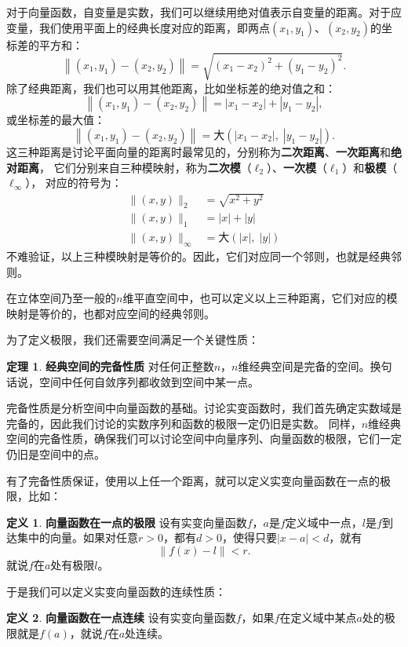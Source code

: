 \documentclass[12pt,UTF8]{ctexbook}
\theoremstyle{definition}
\newtheorem{df}{定义}[section]
\newtheorem{tm}{定理}[section]
\theoremstyle{plain}
\begin{document}
对于向量函数，自变量是实数，我们可以继续用绝对值表示自变量的距离。对于应变量，我们使用平面上的经典长度对应的距离，即两点$(x_1, y_1)$、$(x_2, y_2)$的坐标差的平方和：
$$ \left\| (x_1, y_1) - (x_2, y_2)\right\| = \sqrt{(x_1 - x_2)^2 + (y_1 - y_2)^2}. $$
除了经典距离，我们也可以用其他距离，比如坐标差的绝对值之和：
$$ \left\| (x_1, y_1) - (x_2, y_2)\right\| = |x_1 - x_2| + |y_1 - y_2|,$$
或坐标差的最大值：
$$ \left\| (x_1, y_1) - (x_2, y_2)\right\| = \text{大}(|x_1 - x_2|,\; |y_1 - y_2|). $$
这三种距离是讨论平面向量的距离时最常见的，分别称为\textbf{二次距离}、\textbf{一次距离}和\textbf{绝对距离}，
它们分别来自三种模映射，称为\textbf{二次模}（$\ell_2$）、\textbf{一次模}（$\ell_1$）和\textbf{极模}（$\ell_{\infty}$），
对应的符号为：
\begin{align*}
    \| (x, y)\|_2 \;&= \sqrt{x^2 + y^2} \\
    \| (x, y)\|_1 \;&= |x| + |y| \\
    \| (x, y)\|_{\infty} &= \text{大}(|x|,\; |y|)
\end{align*}
不难验证，以上三种模映射是等价的。因此，它们对应同一个邻则，也就是经典邻则。

在立体空间乃至一般的$n$维平直空间中，也可以定义以上三种距离，它们对应的模映射是等价的，也都对应空间的经典邻则。

为了定义极限，我们还需要空间满足一个关键性质：
\begin{tm}{\textbf{经典空间的完备性质}}
    对任何正整数$n$，$n$维经典空间是完备的空间。换句话说，空间中任何自敛序列都收敛到空间中某一点。
\end{tm}
完备性质是分析空间中向量函数的基础。讨论实变函数时，我们首先确定实数域是完备的，因此我们讨论的实数序列和函数的极限一定仍旧是实数。
同样，$n$维经典空间的完备性质，确保我们可以讨论空间中向量序列、向量函数的极限，它们一定仍旧是空间中的点。

有了完备性质保证，使用以上任一个距离，就可以定义实变向量函数在一点的极限，比如：
\begin{df}{\textbf{向量函数在一点的极限}}
    设有实变向量函数$f$，$a$是$f$定义域中一点，$l$是$f$到达集中的向量。如果对任意$r>0$，都有$d>0$，使得只要$|x - a| < d$，就有
    $$\left\|f(x) - l\right\| < r.$$
    就说$f$在$a$处有极限$l$。
\end{df}

于是我们可以定义实变向量函数的连续性质：
\begin{df}{\textbf{向量函数在一点连续}}
    设有实变向量函数$f$，如果$f$在定义域中某点$a$处的极限就是$f(a)$，就说$f$在$a$处连续。
\end{df}
\end{document}
